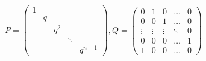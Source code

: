 \begin{equation}
P = \begin{pmatrix} 1&&&&\\
&q&&&\\
&&q^2&&\\
&&&\ddots&\\
&&&&q^{n-1}
 \end{pmatrix}, Q = \begin{pmatrix}0&1&0&\dots&0\\
0&0&1&\dots&0\\
\vdots&\vdots & \vdots &\ddots&0\\
0&0 & 0& \dots&   1\\
1&0&0&\dots&0\end{pmatrix}
\end{equation}

